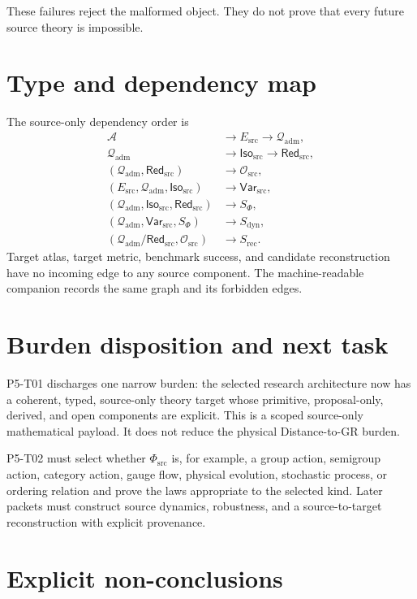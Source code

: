 \documentclass[11pt]{article}
\newcommand{\A}{\mathcal A}
\newcommand{\Esrc}{E_{\mathrm{src}}}
\newcommand{\Qadm}{\mathcal Q_{\mathrm{adm}}}
\newcommand{\Isosrc}{\mathsf{Iso}_{\mathrm{src}}}
\newcommand{\Redsrc}{\mathsf{Red}_{\mathrm{src}}}
\newcommand{\Osrc}{\mathcal O_{\mathrm{src}}}
\newcommand{\Varsrc}{\mathsf{Var}_{\mathrm{src}}}
\newcommand{\PhiSrc}{\Phi_{\mathrm{src}}}
\begin{document}
These failures reject the malformed object. They do not prove that every
future source theory is impossible.

\section{Type and dependency map}

The source-only dependency order is
\[
\begin{aligned}
  \A &\longrightarrow \Esrc \longrightarrow \Qadm,\\
  \Qadm &\longrightarrow \Isosrc \longrightarrow \Redsrc,\\
  (\Qadm,\Redsrc) &\longrightarrow \Osrc,\\
  (\Esrc,\Qadm,\Isosrc) &\longrightarrow \Varsrc,\\
  (\Qadm,\Isosrc,\Redsrc) &\longrightarrow S_{\Phi},\\
  (\Qadm,\Varsrc,S_{\Phi}) &\longrightarrow S_{\mathrm{dyn}},\\
  (\Qadm/\Redsrc,\Osrc) &\longrightarrow S_{\mathrm{rec}}.
\end{aligned}
\]
Target atlas, target metric, benchmark success, and candidate reconstruction
have no incoming edge to any source component. The machine-readable companion
records the same graph and its forbidden edges.

\section{Burden disposition and next task}

P5-T01 discharges one narrow burden: the selected research architecture now
has a coherent, typed, source-only theory target whose primitive,
proposal-only, derived, and open components are explicit. This is a scoped
source-only mathematical payload. It does not reduce the physical
Distance-to-GR burden.

P5-T02 must select whether \(\PhiSrc\) is, for example, a group action,
semigroup action, category action, gauge flow, physical evolution,
stochastic process, or ordering relation and prove the laws appropriate to
the selected kind. Later packets must construct source dynamics, robustness,
and a source-to-target reconstruction with explicit provenance.

\section{Explicit non-conclusions}
\end{document}
